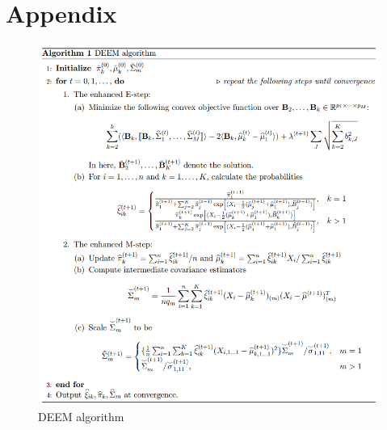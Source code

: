 \documentclass[11pt]{article}
\begin{document}
\section*{Appendix}
\begin{figure}[H]
    \centering
    \includegraphics[width = 16 cm]{deem.png}
    \caption{DEEM algorithm}
    \label{fig:deem}
\end{figure}
\end{document}
